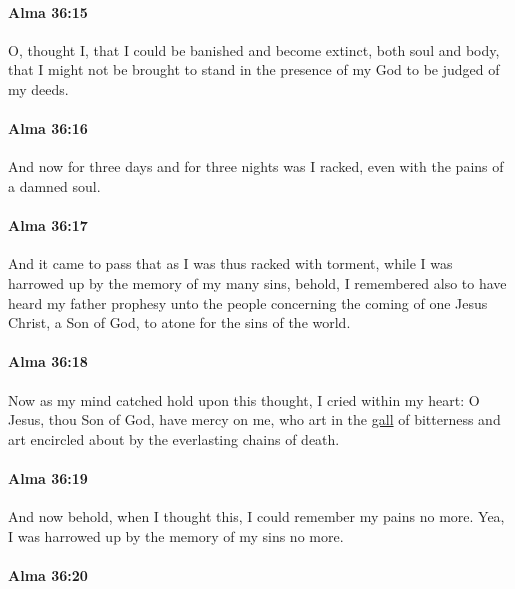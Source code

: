 		\paragraph{Alma 36:15} %
			\label{ALMA-36-15}

			O, thought I, that I could be banished and become extinct, both soul and body,
			that I might not be brought to stand in the presence of my God
			to be judged of my deeds.

		\paragraph{Alma 36:16} %
			\label{ALMA-36-16}

			And now for three days and for three nights was I racked,
			even with the pains of a damned soul.

		\paragraph{Alma 36:17} %
			\label{ALMA-36-17}

			And it came to pass that as I was thus racked with torment,
			while I was harrowed up by the memory of my many sins,
			behold, I remembered also to have heard my father prophesy unto the people
			concerning the coming of one Jesus Christ, a Son of God,
			to atone for the sins of the world.

		\paragraph{Alma 36:18} %
			\label{ALMA-36-18}

			Now as my mind catched hold upon this thought,
			I cried within my heart:
			O Jesus, thou Son of God, have mercy on me,
			who art in the \hyperref[GALL]{gall} of bitterness
			and art encircled about by the everlasting chains of death.

		\paragraph{Alma 36:19} %
			\label{ALMA-36-19}

			And now behold, when I thought this,
			I could remember my pains no more.
			Yea, I was harrowed up by the memory of my sins no more.

		\paragraph{Alma 36:20} %
			\label{ALMA-36-20}

